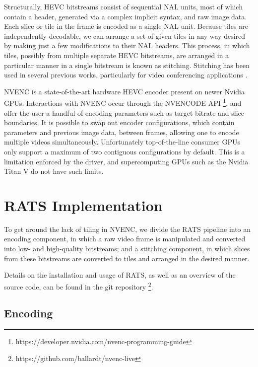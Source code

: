 Structurally, HEVC bitstreams consist of sequential NAL units, most of which contain a header, generated via a complex implicit syntax, and raw image data. Each slice or tile in the frame is encoded as a single NAL unit. Because tiles are independently-decodable, we can arrange a set of given tiles in any way desired by making just a few modifications to their NAL headers. This process, in which tiles, possibly from multiple separate HEVC bitstreams, are arranged in a particular manner in a single bitstream is known as stitching. Stitching has been used in several previous works, particularly for video conferencing applications \cite{amon2012} \cite{feldmann2013} \cite{delafuente2017}.

NVENC is a state-of-the-art hardware HEVC encoder present on newer Nvidia GPUs. Interactions with NVENC occur through the NVENCODE API \footnote{https://developer.nvidia.com/nvenc-programming-guide}, and offer the user a handful of encoding parameters such as target bitrate and slice boundaries. It is possible to swap out encoder configurations, which contain parameters and previous image data, between frames, allowing one to encode multiple videos simultaneously. Unfortunately top-of-the-line consumer GPUs only support a maximum of two contiguous configurations by default. This is a limitation enforced by the driver, and supercomputing GPUs such as the Nvidia Titan V do not have such limits.

\section{RATS Implementation} \label{rats}
To get around the lack of tiling in NVENC, we divide the RATS pipeline into an encoding component, in which a raw video frame is manipulated and converted into low- and high-quality bitstreams; and a stitching component, in which slices from these bitstreams are converted to tiles and arranged in the desired manner.

Details on the installation and usage of RATS, as well as an overview of the source code, can be found in the git repository \footnote{https://github.com/ballardt/nvenc-live}.

\subsection{Encoding}

